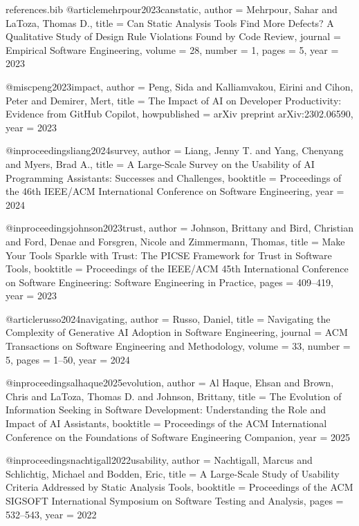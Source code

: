 \begin{filecontents*}[overwrite]{references.bib}
@article{mehrpour2023canstatic,
  author  = {Mehrpour, Sahar and LaToza, Thomas D.},
  title   = {Can Static Analysis Tools Find More Defects? A Qualitative Study of Design Rule Violations Found by Code Review},
  journal = {Empirical Software Engineering},
  volume  = {28},
  number  = {1},
  pages   = {5},
  year    = {2023}
}


@misc{peng2023impact,
  author       = {Peng, Sida and Kalliamvakou, Eirini and Cihon, Peter and Demirer, Mert},
  title        = {The Impact of AI on Developer Productivity: Evidence from GitHub Copilot},
  howpublished = {arXiv preprint arXiv:2302.06590},
  year         = {2023}
}

@inproceedings{liang2024survey,
  author    = {Liang, Jenny T. and Yang, Chenyang and Myers, Brad A.},
  title     = {A Large-Scale Survey on the Usability of AI Programming Assistants: Successes and Challenges},
  booktitle = {Proceedings of the 46th IEEE/ACM International Conference on Software Engineering},
  year      = {2024}
}

@inproceedings{johnson2023trust,
  author    = {Johnson, Brittany and Bird, Christian and Ford, Denae and Forsgren, Nicole and Zimmermann, Thomas},
  title     = {Make Your Tools Sparkle with Trust: The PICSE Framework for Trust in Software Tools},
  booktitle = {Proceedings of the IEEE/ACM 45th International Conference on Software Engineering: Software Engineering in Practice},
  pages     = {409--419},
  year      = {2023}
}

@article{russo2024navigating,
  author  = {Russo, Daniel},
  title   = {Navigating the Complexity of Generative AI Adoption in Software Engineering},
  journal = {ACM Transactions on Software Engineering and Methodology},
  volume  = {33},
  number  = {5},
  pages   = {1--50},
  year    = {2024}
}

@inproceedings{alhaque2025evolution,
  author    = {Al Haque, Ehsan and Brown, Chris and LaToza, Thomas D. and Johnson, Brittany},
  title     = {The Evolution of Information Seeking in Software Development: Understanding the Role and Impact of AI Assistants},
  booktitle = {Proceedings of the ACM International Conference on the Foundations of Software Engineering Companion},
  year      = {2025}
}

@inproceedings{nachtigall2022usability,
  author    = {Nachtigall, Marcus and Schlichtig, Michael and Bodden, Eric},
  title     = {A Large-Scale Study of Usability Criteria Addressed by Static Analysis Tools},
  booktitle = {Proceedings of the ACM SIGSOFT International Symposium on Software Testing and Analysis},
  pages     = {532--543},
  year      = {2022}
}


\end{filecontents*}
